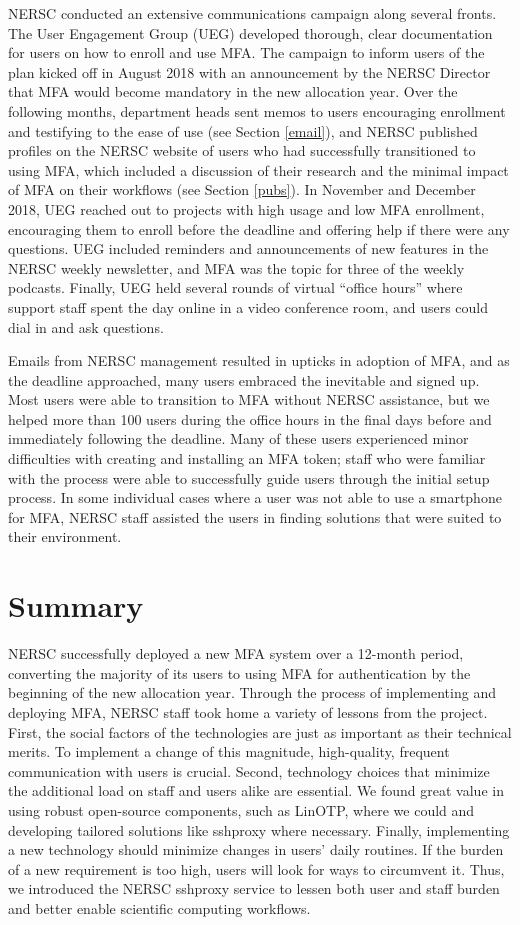 \documentclass[sigconf,review]{acmart}
\begin{document}
NERSC conducted an extensive communications campaign along several fronts. The
User Engagement Group (UEG) developed thorough, clear documentation for users on
how to enroll and use MFA. The campaign to inform users of the plan kicked off
in August 2018 with an announcement by the NERSC Director that MFA would become
mandatory in the new allocation year. Over the following months, department heads
sent memos to users encouraging enrollment and testifying to the ease of use
(see Section \ref{email}),
and NERSC published profiles on the NERSC website of users who had successfully
transitioned to using MFA, which included a discussion of their research and the
minimal impact of MFA on their workflows (see Section \ref{pubs}).
In November and December 2018, UEG
reached out to projects with high usage and low MFA enrollment, encouraging them
to enroll before the deadline and offering help if there were any questions. UEG
included reminders and announcements of new features in the NERSC weekly
newsletter, and MFA was the topic for three of the weekly podcasts. Finally, UEG
held several rounds of virtual ``office hours'' where support staff spent the
day online in a video conference room, and users could dial in and ask
questions.

Emails from NERSC management resulted in upticks in adoption of MFA, and as the
deadline approached, many users embraced the inevitable and signed up. Most
users were able to transition to MFA without NERSC assistance, but we helped
more than 100 users during the office hours in the final days before and
immediately following the deadline. Many of these users experienced minor
difficulties with creating and installing an MFA token; staff who were
familiar with the process were able to successfully guide users through the
initial setup process. In some individual cases where a user was not able to
use a smartphone for MFA, NERSC staff assisted the users in finding solutions
that were suited to their environment.

\section{Summary}
\label{summary}

NERSC successfully deployed a new MFA system over a 12-month period, converting
the majority of its users to using MFA for authentication by the beginning of
the new allocation year. Through the process of implementing and deploying MFA,
NERSC staff took home a variety of lessons from the project. First, the social
factors of the technologies are just as important as their technical merits. To
implement a change of this magnitude, high-quality, frequent communication with
users is crucial. Second, technology choices that minimize the additional load
on staff and users alike are essential. We found great value in using robust 
open-source components, such as LinOTP, where we could and developing tailored
solutions like sshproxy where necessary. Finally, implementing a new technology
should minimize changes in users' daily routines. If the burden of a new
requirement is too high, users will look for ways to circumvent it. Thus, we
introduced the NERSC sshproxy service to lessen both user and staff burden and
better enable scientific computing workflows.
\end{document}
